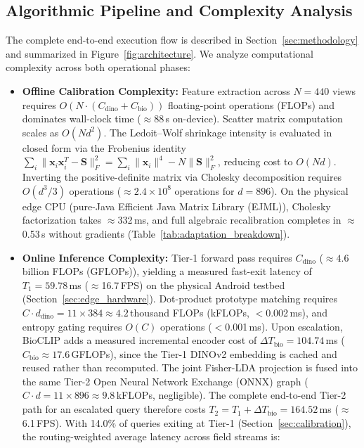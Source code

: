 \documentclass[preprint,12pt]{elsarticle}
\begin{document}
\subsection{Algorithmic Pipeline and Complexity Analysis}
\label{sec:complexity}
The complete end-to-end execution flow is described in Section~\ref{sec:methodology} and summarized in Figure~\ref{fig:architecture}. We analyze computational complexity across both operational phases:
\begin{itemize}
    \item \textbf{Offline Calibration Complexity:} Feature extraction across $N=440$ views requires $O(N \cdot (C_{\text{dino}} + C_{\text{bio}}))$ floating-point operations (FLOPs) and dominates wall-clock time ($\approx$88\,s on-device). Scatter matrix computation scales as $O(N d^2)$. The Ledoit--Wolf shrinkage intensity is evaluated in closed form via the Frobenius identity $\sum_i \|\mathbf{x}_i \mathbf{x}_i^T - \mathbf{S}\|_F^2 = \sum_i \|\mathbf{x}_i\|^4 - N \|\mathbf{S}\|_F^2$, reducing cost to $O(N d)$. Inverting the positive-definite matrix via Cholesky decomposition requires $O(d^3 / 3)$ operations ($\approx 2.4 \times 10^8$ operations for $d=896$). On the physical edge CPU (pure-Java Efficient Java Matrix Library (EJML)), Cholesky factorization takes $\approx$332\,ms, and full algebraic recalibration completes in $\approx$0.53\,s without gradients (Table~\ref{tab:adaptation_breakdown}).
    \item \textbf{Online Inference Complexity:} Tier-1 forward pass requires $C_{\text{dino}}$ ($\approx 4.6$\,billion FLOPs (GFLOPs)), yielding a measured fast-exit latency of $T_1 = 59.78$\,ms ($\approx$16.7\,FPS) on the physical Android testbed (Section~\ref{sec:edge_hardware}). Dot-product prototype matching requires $C \cdot d_{\text{dino}} = 11 \times 384 \approx 4.2$\,thousand FLOPs (kFLOPs, $<$0.002\,ms), and entropy gating requires $O(C)$ operations ($<$0.001\,ms). Upon escalation, BioCLIP adds a measured incremental encoder cost of $\Delta T_{\text{bio}} = 104.74$\,ms ($C_{\text{bio}} \approx 17.6$\,GFLOPs), since the Tier-1 DINOv2 embedding is cached and reused rather than recomputed. The joint Fisher-LDA projection is fused into the same Tier-2 Open Neural Network Exchange (ONNX) graph ($C \cdot d = 11 \times 896 \approx 9.8$\,kFLOPs, negligible). The complete end-to-end Tier-2 path for an escalated query therefore costs $T_2 = T_1 + \Delta T_{\text{bio}} = 164.52$\,ms ($\approx$6.1\,FPS). With 14.0\% of queries exiting at Tier-1 (Section~\ref{sec:calibration}), the routing-weighted average latency across field streams is:

\end{itemize}
\end{document}
